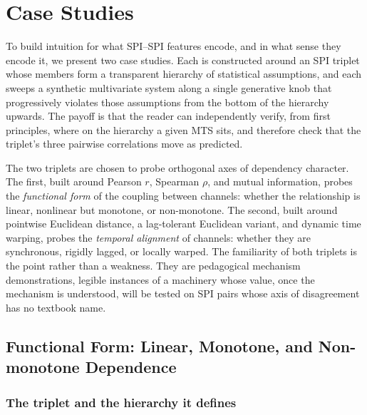 \documentclass{article}
\theoremstyle{plain}
\theoremstyle{definition}
\theoremstyle{remark}
\begin{document}
\section{Case Studies}
\label{sec:casestudies}

To build intuition for what SPI--SPI features encode, and in what sense they encode it, we present two case studies. Each is constructed around an SPI triplet whose members form a transparent hierarchy of statistical assumptions, and each sweeps a synthetic multivariate system along a single generative knob that progressively violates those assumptions from the bottom of the hierarchy upwards. The payoff is that the reader can independently verify, from first principles, where on the hierarchy a given MTS sits, and therefore check that the triplet's three pairwise correlations move as predicted.

The two triplets are chosen to probe orthogonal axes of dependency character. The first, built around Pearson $r$, Spearman $\rho$, and mutual information, probes the \emph{functional form} of the coupling between channels: whether the relationship is linear, nonlinear but monotone, or non-monotone. The second, built around pointwise Euclidean distance, a lag-tolerant Euclidean variant, and dynamic time warping, probes the \emph{temporal alignment} of channels: whether they are synchronous, rigidly lagged, or locally warped. The familiarity of both triplets is the point rather than a weakness. They are pedagogical mechanism demonstrations, legible instances of a machinery whose value, once the mechanism is understood, will be tested on SPI pairs whose axis of disagreement has no textbook name.

\subsection{Functional Form: Linear, Monotone, and Non-monotone Dependence}
\label{sec:case1}

\subsubsection{The triplet and the hierarchy it defines}
\end{document}
